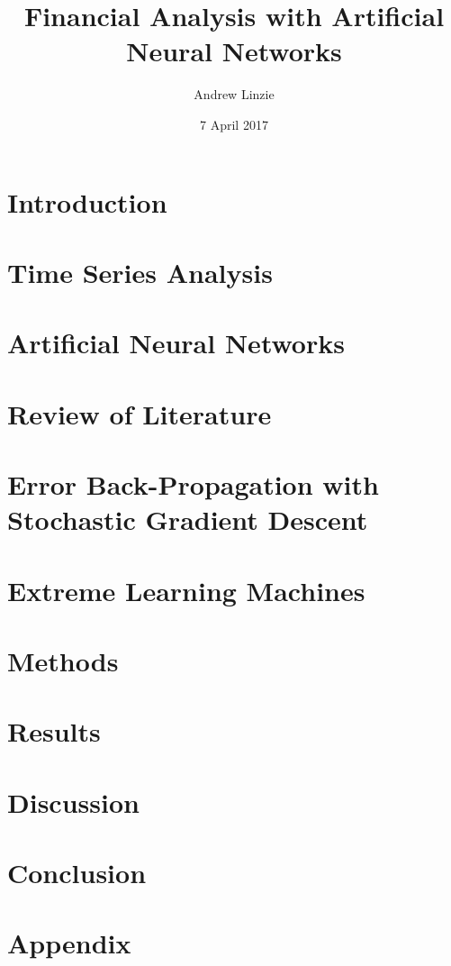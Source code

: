 \documentclass[11pt]{report}
\begin{document}
    \title{Financial Analysis with Artificial Neural Networks}
    \author{Andrew Linzie}
    \date{7 April 2017}
    \maketitle

    \chapter{Introduction}\label{ch:introduction}
    

    \chapter{Time Series Analysis}\label{ch:time-series-analysis}
    
    
    \chapter{Artificial Neural Networks}\label{ch:artificial-neural-networks}
    

    \chapter{Review of Literature}\label{ch:review-of-literature}
    

    \chapter{Error Back-Propagation with Stochastic Gradient Descent}\label{ch:error-back-propagation-with-stochastic-gradient-descent}
    

    \chapter{Extreme Learning Machines}\label{ch:extreme-learning-machines}
    

    \chapter{Methods}\label{ch:methods}
    

    \chapter{Results}\label{ch:results}
    

    \chapter{Discussion}\label{ch:discussion}
    

    \chapter{Conclusion}\label{ch:conclusion}
    

    \chapter{Appendix}\label{ch:appendix}
    
\end{document}
